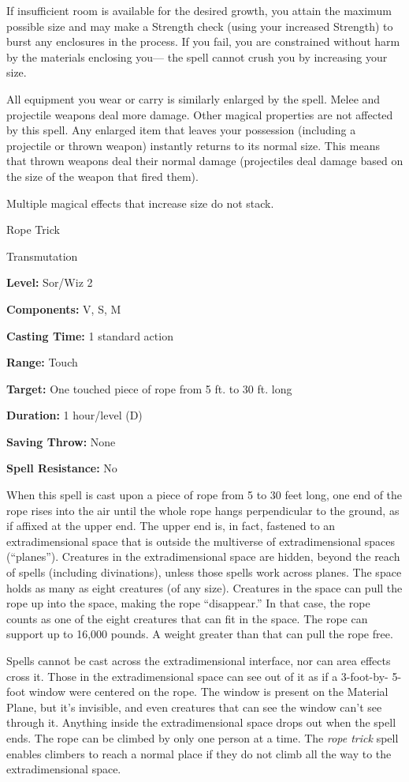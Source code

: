 \documentclass{article}
\begin{document}
If insufficient room is available for the desired growth, you attain the maximum 
possible size and may make a Strength check (using your increased Strength) to 
burst any enclosures in the process. If you fail, you are constrained without harm 
by the materials enclosing you--- the spell cannot crush you by increasing your 
size.

All equipment you wear or carry is similarly enlarged by the spell. Melee and projectile 
weapons deal more damage. Other magical properties are not affected by this spell. 
Any enlarged item that leaves your possession (including a projectile or thrown 
weapon) instantly returns to its normal size. This means that thrown weapons deal 
their normal damage (projectiles deal damage based on the size of the weapon that 
fired them).

Multiple magical effects that increase size do not stack.

\vspace{12pt}
Rope Trick

Transmutation

\textbf{Level:} Sor/Wiz 2

\textbf{Components:} V, S, M

\textbf{Casting Time:} 1 standard action

\textbf{Range:} Touch

\textbf{Target:} One touched piece of rope from 5 ft. to 30 ft. long

\textbf{Duration:} 1 hour/level (D)

\textbf{Saving Throw:} None

\textbf{Spell Resistance:} No

When this spell is cast upon a piece of rope from 5 to 30 feet long, one end of 
the rope rises into the air until the whole rope hangs perpendicular to the ground, 
as if affixed at the upper end. The upper end is, in fact, fastened to an extradimensional 
space that is outside the multiverse of extradimensional spaces (``planes''). Creatures 
in the extradimensional space are hidden, beyond the reach of spells (including 
divinations), unless those spells work across planes. The space holds as many as 
eight creatures (of any size). Creatures in the space can pull the rope up into 
the space, making the rope ``disappear.'' In that case, the rope counts as one 
of the eight creatures that can fit in the space. The rope can support up to 16,000 
pounds. A weight greater than that can pull the rope free.

Spells cannot be cast across the extradimensional interface, nor can area effects 
cross it. Those in the extradimensional space can see out of it as if a 3-foot-by- 
5-foot window were centered on the rope. The window is present on the Material 
Plane, but it's invisible, and even creatures that can see the window can't see 
through it. Anything inside the extradimensional space drops out when the spell 
ends. The rope can be climbed by only one person at a time. The \textit{rope trick 
}spell enables climbers to reach a normal place if they do not climb all the way 
to the extradimensional space.
\end{document}
